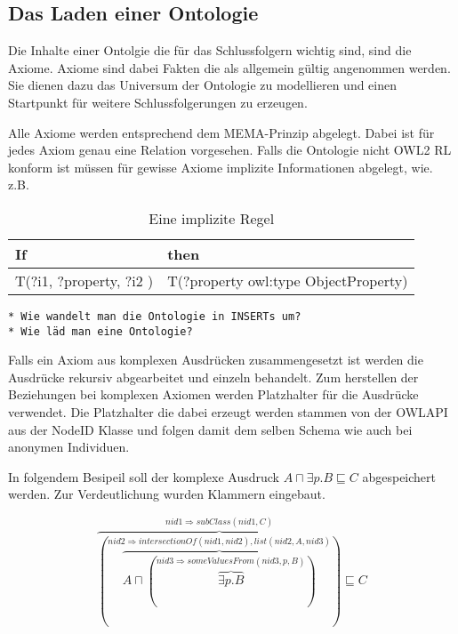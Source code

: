 \subsection{Das Laden einer Ontologie}

Die Inhalte einer Ontolgie die für das Schlussfolgern wichtig sind, sind die Axiome. Axiome sind dabei Fakten die als allgemein gültig angenommen werden. Sie dienen dazu das Universum der Ontologie zu modellieren und einen Startpunkt für weitere Schlussfolgerungen zu erzeugen.

Alle Axiome werden entsprechend dem MEMA-Prinzip abgelegt. Dabei ist für jedes Axiom genau eine Relation vorgesehen. Falls die Ontologie nicht OWL2 RL konform ist müssen für gewisse Axiome implizite Informationen abgelegt, wie. z.B.

\begin{table}
	\caption{Eine implizite Regel}
	\label{rule-impl}
\begin{center}
	\begin{tabular}{l|l}
    If & then \\ \hline
	T(?i1, ?property, ?i2 ) & T(?property owl:type ObjectProperty) \\
   \end{tabular}
\end{center}
\end{table}


\begin{verbatim}
* Wie wandelt man die Ontologie in INSERTs um?
* Wie läd man eine Ontologie?
\end{verbatim}


Falls ein Axiom aus komplexen Ausdrücken zusammengesetzt ist werden die Ausdrücke rekursiv abgearbeitet und einzeln behandelt. Zum herstellen der Beziehungen bei komplexen Axiomen werden Platzhalter für die Ausdrücke verwendet. Die Platzhalter die dabei erzeugt werden stammen von der OWLAPI aus der NodeID Klasse und folgen damit dem selben Schema wie auch bei anonymen Individuen.

In folgendem Besipeil soll der komplexe Ausdruck $A \sqcap \exists p.B \sqsubseteq C$ abgespeichert werden. Zur Verdeutlichung wurden Klammern eingebaut.

\begin{equation}
\overbrace{
	(\overbrace{A \sqcap (
		\overbrace{\exists{}p.B}
		^{nid3 \Rightarrow someValuesFrom(nid3, p, B)})}
	^{nid2 \Rightarrow intersectionOf(nid1, nid2), list(nid2, A, nid3)})}
^{nid1 \Rightarrow subClass(nid1, C)} \sqsubseteq C
\end{equation}

